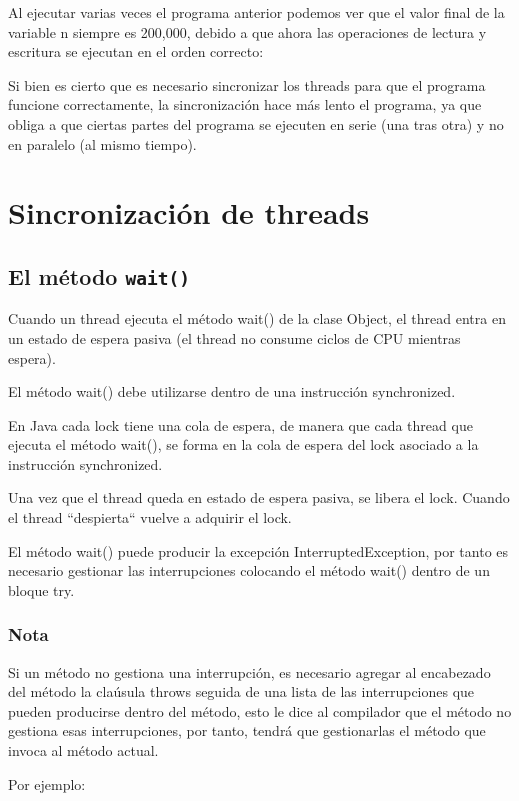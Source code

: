 \documentclass[11pt,a4paper,oneside]{book}
\begin{document}
Al ejecutar varias veces el programa anterior podemos ver que el valor final de la variable n siempre es 200,000, debido a que ahora las operaciones de lectura y escritura se ejecutan en el orden correcto:

Si bien es cierto que es necesario sincronizar los threads para que el programa funcione correctamente, la sincronización hace más lento el programa, ya que obliga a que ciertas partes del programa se ejecuten en serie (una tras otra) y no en paralelo (al mismo tiempo).

\section{Sincronización de threads}

\subsection{El método \texttt{wait()}}

Cuando un thread ejecuta el método wait() de la clase Object, el thread entra en un estado de espera pasiva (el thread no consume ciclos de CPU mientras espera).

El método wait() debe utilizarse dentro de una instrucción synchronized.

En Java cada lock tiene una cola de espera, de manera que cada thread que ejecuta el método wait(), se forma en la cola de espera del lock asociado a la instrucción synchronized.

Una vez que el thread queda en estado de espera pasiva, se libera el lock. Cuando el thread ``despierta`` vuelve a adquirir el lock.

El método wait() puede producir la excepción InterruptedException, por tanto es necesario gestionar las interrupciones colocando el método wait() dentro de un bloque try.

\subsubsection{Nota}

Si un método no gestiona una interrupción, es necesario agregar al encabezado del método la claúsula throws seguida de una lista de las interrupciones que pueden producirse dentro del método, esto le dice al compilador que el método no gestiona esas interrupciones, por tanto, tendrá que gestionarlas el método que invoca al método actual.

Por ejemplo:
\end{document}
